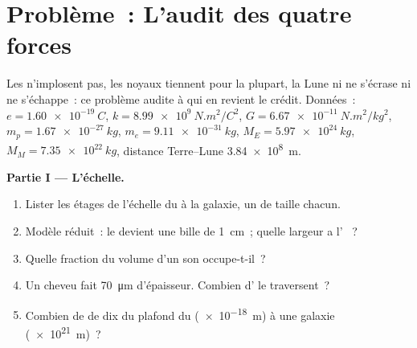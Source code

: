 \section{Problème~: L'audit des quatre forces}

\begin{problem}
\label{pb:g11:fundamental-interactions:1}
Les  n'implosent pas, les noyaux
tiennent pour la plupart, la Lune ni ne s'écrase ni ne s'échappe~: ce
problème audite à qui en revient le crédit. Données~:
$e = \qty{1.60e-19}{C}$,
$k = \qty{8.99e9}{N.m^2/C^2}$, $G = \qty{6.67e-11}{N.m^2/kg^2}$,
$m_p = \qty{1.67e-27}{kg}$, $m_e = \qty{9.11e-31}{kg}$,
$M_E = \qty{5.97e24}{kg}$, $M_M = \qty{7.35e22}{kg}$, distance
Terre--Lune \qty{3.84e8}{m}.

\medskip
\noindent\textbf{Partie I --- L'échelle.}
\begin{enumerate}
  \item Lister les étages de l'échelle du
         à la galaxie, un
         de taille chacun.
  \item Modèle réduit~: le  devient
        une bille de \qty{1}{cm}~; quelle largeur a l'
        ~?
  \item Quelle fraction du volume d'un
         son
         occupe-t-il~?
  \item Un cheveu fait \qty{70}{\micro m} d'épaisseur. Combien
        d' le traversent~?
  \item Combien de  de dix du plafond
        du  (\qty{e-18}{m}) à une
        galaxie (\qty{e21}{m})~?
\end{enumerate}


\end{problem}
